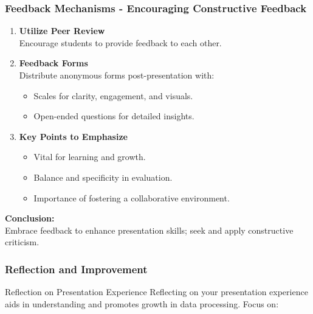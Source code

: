 \documentclass[aspectratio=169]{beamer}
\begin{document}
\begin{frame}[fragile]
    \frametitle{Feedback Mechanisms - Encouraging Constructive Feedback}
    \begin{enumerate}
        \item \textbf{Utilize Peer Review} \\
            Encourage students to provide feedback to each other.
        
        \item \textbf{Feedback Forms} \\
            Distribute anonymous forms post-presentation with:
            \begin{itemize}
                \item Scales for clarity, engagement, and visuals.
                \item Open-ended questions for detailed insights.
            \end{itemize}
        
        \item \textbf{Key Points to Emphasize} \\
            \begin{itemize}
                \item Vital for learning and growth.
                \item Balance and specificity in evaluation.
                \item Importance of fostering a collaborative environment.
            \end{itemize}
    \end{enumerate}

    \textbf{Conclusion:} \\
    Embrace feedback to enhance presentation skills; seek and apply constructive criticism.
\end{frame}

\begin{frame}[fragile]
    \frametitle{Reflection and Improvement}
    \begin{block}{Reflection on Presentation Experience}
        Reflecting on your presentation experience aids in understanding and promotes growth in data processing. Focus on:
    \end{block}
\end{frame}
\end{document}

